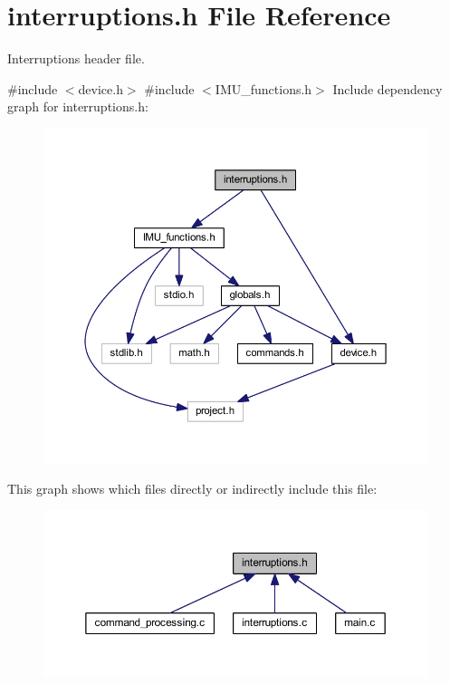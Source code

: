 \section{interruptions.\+h File Reference}
\label{interruptions_8h}


Interruptions header file.  


{\ttfamily \#include $<$device.\+h$>$}\newline
{\ttfamily \#include $<$I\+M\+U\+\_\+functions.\+h$>$}\newline
Include dependency graph for interruptions.\+h\+:
\nopagebreak
\begin{figure}[H]
\begin{center}
\leavevmode
\includegraphics[width=350pt]{interruptions_8h__incl}
\end{center}
\end{figure}
This graph shows which files directly or indirectly include this file\+:
\nopagebreak
\begin{figure}[H]
\begin{center}
\leavevmode
\includegraphics[width=350pt]{interruptions_8h__dep__incl}
\end{center}
\end{figure}
